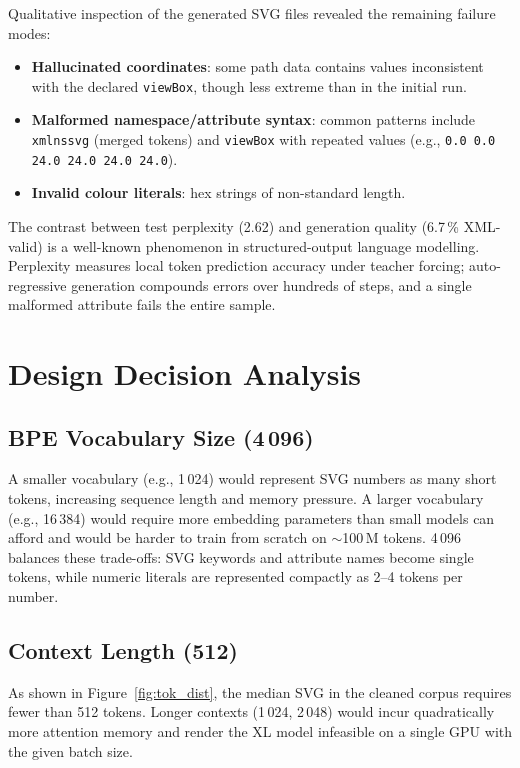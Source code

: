 \documentclass[11pt,a4paper]{article}
\begin{document}
Qualitative inspection of the generated SVG files revealed the remaining failure modes:
\begin{itemize}
  \item \textbf{Hallucinated coordinates}: some path data contains values inconsistent
        with the declared \texttt{viewBox}, though less extreme than in the initial run.
  \item \textbf{Malformed namespace/attribute syntax}: common patterns include
        \texttt{xmlnssvg} (merged tokens) and \texttt{viewBox} with repeated values
        (e.g., \texttt{0.0 0.0 24.0 24.0 24.0 24.0}).
  \item \textbf{Invalid colour literals}: hex strings of non-standard length.
\end{itemize}

The contrast between test perplexity (2.62) and generation quality (6.7\,\% XML-valid)
is a well-known phenomenon in structured-output language modelling.  Perplexity measures
local token prediction accuracy under teacher forcing; auto-regressive generation
compounds errors over hundreds of steps, and a single malformed attribute fails the
entire sample.

\section{Design Decision Analysis}

\subsection{BPE Vocabulary Size (4\,096)}

A smaller vocabulary (e.g., 1\,024) would represent SVG numbers as many short tokens,
increasing sequence length and memory pressure.  A larger vocabulary (e.g., 16\,384)
would require more embedding parameters than small models can afford and would be harder
to train from scratch on $\sim$100\,M tokens.  4\,096 balances these trade-offs: SVG
keywords and attribute names become single tokens, while numeric literals are represented
compactly as 2--4 tokens per number.

\subsection{Context Length (512)}

As shown in Figure~\ref{fig:tok_dist}, the median SVG in the cleaned corpus requires
fewer than 512 tokens.  Longer contexts (1\,024, 2\,048) would incur quadratically more
attention memory and render the XL model infeasible on a single GPU with the given batch
size.
\end{document}
